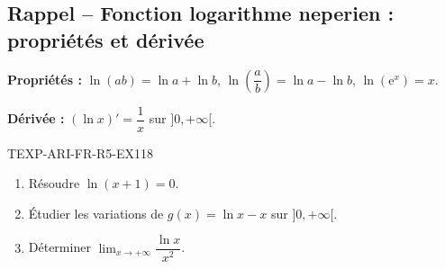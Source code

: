 

\subsection*{Rappel -- Fonction logarithme neperien : propriétés et dérivée}

\textbf{Propriétés :} $\ln(ab) = \ln a + \ln b$, $\ln\left(\dfrac{a}{b}\right) = \ln a - \ln b$, $\ln(\mathrm{e}^x) = x$.

\textbf{Dérivée :} $(\ln x)' = \dfrac{1}{x}$ sur $]0, +\infty[$.

\begin{exercice}{TEXP-ARI-FR-R5-EX1}{1}{8}
\begin{enumerate}
  \item Résoudre $\ln(x + 1) = 0$.
  \item Étudier les variations de $g(x) = \ln x - x$ sur $]0, +\infty[$.
  \item Déterminer $\lim_{x \to +\infty} \dfrac{\ln x}{x^2}$.
\end{enumerate}
\end{exercice}

